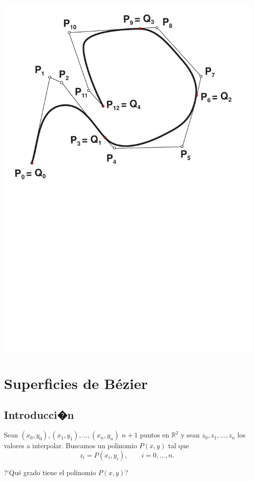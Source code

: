 \documentclass[ebook,oneside]{memoir}
\begin{document}
\begin{center}
\includegraphics[scale=0.45]{3_30.pdf}
\end{center}

\section{Superficies de B\'{e}zier}

\subsection{Introducci�n}

Sean $(x_0,y_0),(x_1,y_1), \ldots,(x_n,y_n)$  \quad $n+1$ puntos en $\mathbb{R}^2$ y sean $z_0,z_1,\ldots,z_n$ los valores a interpolar. Buscamos un polinomio $P(x,y)$ tal que
$$z_i=P(x_i,y_i), \quad \quad i=0,\ldots,n.$$

?`Qu\'{e} grado tiene el polinomio $P(x,y)$?
\end{document}
